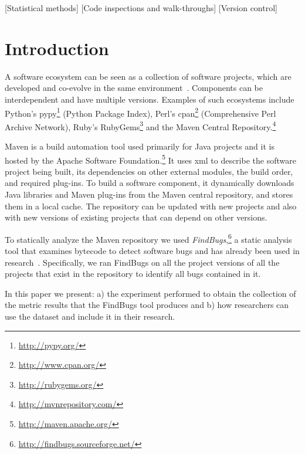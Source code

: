 \documentclass{sig-alternate}
\begin{document}
[Statistical methods]
[Code inspections and walk-throughs]
[Version control]



\section{Introduction}
\label{sec:intro}

A software ecosystem can be seen as a collection of software projects,
which are developed and co-evolve in the same environment~\cite{LL10}.
Components can be interdependent and have multiple versions.
Examples of such ecosystems include Python's
{\sc p}y{\sc py}\footnote{\url{http://pypy.org/}}
(Python Package Index), Perl's
{\sc cpan}\footnote{\url{http://www.cpan.org/}}
(Comprehensive Perl Archive Network), Ruby's
RubyGems\footnote{\url{http://rubygems.org/}}
and the Maven Central Repository.\footnote{\url{http://mvnrepository.com/}}

Maven is a build automation tool used primarily for Java projects and it is
hosted by the Apache Software Foundation.\footnote{\url{http://maven.apache.org/}}
It uses {\sc xml} to describe the software project being built, its dependencies
on other external modules, the build order, and required plug-ins.
To build a software component, it dynamically downloads Java libraries
and Maven plug-ins from the Maven central repository,
and stores them in a local cache. The repository can be updated with
new projects and also with new versions of existing projects
that can depend on other versions.

To statically analyze the Maven repository
we used {\it FindBugs},\footnote{\url{http://findbugs.sourceforge.net/}}
a static analysis tool that examines bytecode to detect software bugs
and has already been used in research~\cite{AP10,SHP06}.
Specifically, we ran FindBugs on all the project versions of all
the projects that exist in the repository
to identify all bugs contained in it.

In this paper we present: a) the experiment performed to obtain the
collection of the metric results that the FindBugs tool produces and
b) how researchers can use the dataset and include it in their research.
\end{document}
